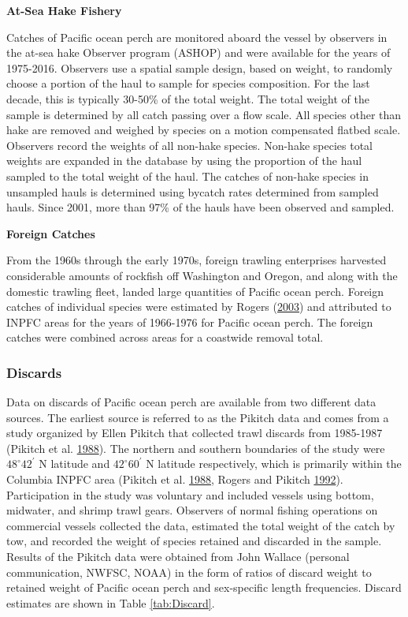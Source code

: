 \documentclass[12pt,]{article}
\begin{document}
\textbf{At-Sea Hake Fishery}

Catches of Pacific ocean perch are monitored aboard the vessel by
observers in the at-sea hake Observer program (ASHOP) and were available
for the years of 1975-2016. Observers use a spatial sample design, based
on weight, to randomly choose a portion of the haul to sample for
species composition. For the last decade, this is typically 30-50\% of
the total weight. The total weight of the sample is determined by all
catch passing over a flow scale. All species other than hake are removed
and weighed by species on a motion compensated flatbed scale. Observers
record the weights of all non-hake species. Non-hake species total
weights are expanded in the database by using the proportion of the haul
sampled to the total weight of the haul. The catches of non-hake species
in unsampled hauls is determined using bycatch rates determined from
sampled hauls. Since 2001, more than 97\% of the hauls have been
observed and sampled.

\textbf{Foreign Catches}

From the 1960s through the early 1970s, foreign trawling enterprises
harvested considerable amounts of rockfish off Washington and Oregon,
and along with the domestic trawling fleet, landed large quantities of
Pacific ocean perch. Foreign catches of individual species were
estimated by Rogers (\protect\hyperlink{ref-rogers_species_2003}{2003})
and attributed to INPFC areas for the years of 1966-1976 for Pacific
ocean perch. The foreign catches were combined across areas for a
coastwide removal total.

\subsubsection{Discards}\label{discards}

Data on discards of Pacific ocean perch are available from two different
data sources. The earliest source is referred to as the Pikitch data and
comes from a study organized by Ellen Pikitch that collected trawl
discards from 1985-1987 (Pikitch et al.
\protect\hyperlink{ref-pikitch_evaluation_1988}{1988}). The northern and
southern boundaries of the study were \(48^\circ 42^\prime\) N latitude
and \(42^\circ 60^\prime\) N latitude respectively, which is primarily
within the Columbia INPFC area (Pikitch et al.
\protect\hyperlink{ref-pikitch_evaluation_1988}{1988}, Rogers and
Pikitch \protect\hyperlink{ref-rogers_numerical_1992}{1992}).
Participation in the study was voluntary and included vessels using
bottom, midwater, and shrimp trawl gears. Observers of normal fishing
operations on commercial vessels collected the data, estimated the total
weight of the catch by tow, and recorded the weight of species retained
and discarded in the sample. Results of the Pikitch data were obtained
from John Wallace (personal communication, NWFSC, NOAA) in the form of
ratios of discard weight to retained weight of Pacific ocean perch and
sex-specific length frequencies. Discard estimates are shown in Table
\ref{tab:Discard}.
\end{document}
